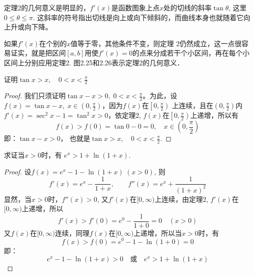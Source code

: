 定理2的几何意义是明显的，$f'(x)$是函数图象上点$x$处的切线的斜率$\tan\theta$, 这里$0\le\theta \le \pi$. 这斜率的符号指出切线是向上或向下倾斜的，而曲线本身也就随着它向上升或向下降。

如果$f'(x)$在个别的$x$值等于零，其他条件不变，则定理
2仍然成立，这一点很容易证实，就是把区间$[a,b]$用使$f'(x)=0$的点来分成若干个小区间，再在每个小区间上分别应用定理2. 图2.25和2.26表示定理2的几何意义．

\begin{figure}[htp]
    \centering
    \begin{minipage}[t]{0.48\textwidth}
    \centering
\begin{tikzpicture}[>=latex, scale=1]
    
\end{tikzpicture}
    \caption{}
    \end{minipage}
    \begin{minipage}[t]{0.48\textwidth}
    \centering
    \begin{tikzpicture}[>=stealth, scale=1.5]
       
    \end{tikzpicture}
    \caption{}
    \end{minipage}
    \end{figure}



\begin{example}
证明$\tan x>x,\quad 0<x<\frac{\pi}{2}$
\end{example}


\begin{proof}
我们只须证明$\tan x-x>0,\; 0<x<\frac{\pi}{2}$。为此，设$f(x)=\tan x-x,\; x\in\left(0,\frac{\pi}{2}\right)$，因为$f(x)$在$\left[0,\frac{\pi}{2}\right)$
上连续，且在$\left(0,\frac{\pi}{2}\right)$内$f'(x)=\sec^2x-1=\tan^2 x>0$，依定理2, $f(x)$在$\left[0,\frac{\pi}{2}\right)$上递增，所以有
\[f (x) > f (0) =\tan 0-0=0,\quad x\in \left(0,\frac{\pi}{2}\right)\]
即：$\tan x-x>0$，
也就是$\tan x>x,\quad 0<x<\frac{\pi}{2}$.
\end{proof}

\begin{example}
        求证当$x>0$时，有
$e^x> 1+\ln (1+x) $.
\end{example}


\begin{proof}
设$f(x)=e^x-1-\ln(1+x)\; (x>0)$, 则
\[f' (x) =e^x-\frac{1}{1+x},\qquad 
f''(x) =e^x +\frac{1}{(1+x)^2}\] 
    显然，当$x>0$时，$f''(x)>0$, 又$f'(x)$在$[0,\infty)$上连续，由定理2, $f'(x)$在$[0,\infty)$上递增，所以
\[f' (x) > f' (0) =e^0-\frac{1}{1+0}=0\quad  (x> 0) \]
又$f(x)$在$[0, \infty)$连续，同理$f(x)$在$[0, \infty)$上递增，所以当$x>0$时，有
\[f (x) > f (0) =e^0-1-\ln (1+0) =0\]
即：
\[e^x-1-\ln(1+x)>0\quad \text{或}\quad e^x>1+\ln(1+x)\]
\end{proof}


